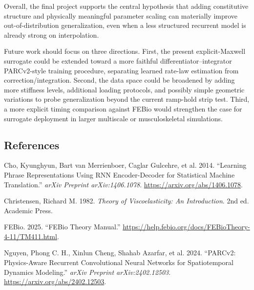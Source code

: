 \documentclass[
  10pt,
  letterpaper,
  DIV=11,
  numbers=noendperiod]{scrartcl}
\newlength{\cslhangindent}
\newenvironment{CSLReferences}[2] %
 {\begin{list}{}{%
  \setlength{\itemindent}{0pt}
  \setlength{\leftmargin}{0pt}
  \setlength{\parsep}{0pt}
  \ifodd #1
   \setlength{\leftmargin}{\cslhangindent}
   \setlength{\itemindent}{-1\cslhangindent}
  \fi
  \setlength{\itemsep}{#2\baselineskip}}}
 {\end{list}}
\begin{document}
Overall, the final project supports the central hypothesis that adding
constitutive structure and physically meaningful parameter scaling can
materially improve out-of-distribution generalization, even when a less
structured recurrent model is already strong on interpolation.

Future work should focus on three directions. First, the present
explicit-Maxwell surrogate could be extended toward a more faithful
differentiator--integrator PARCv2-style training procedure, separating
learned rate-law estimation from correction/integration. Second, the
data space could be broadened by adding more stiffness levels,
additional loading protocols, and possibly simple geometric variations
to probe generalization beyond the current ramp-hold strip test. Third,
a more explicit timing comparison against FEBio would strengthen the
case for surrogate deployment in larger multiscale or musculoskeletal
simulations.

\subsection*{References}\label{references}

\protect{}\label{refs}
\begin{CSLReferences}{1}{1}
Cho, Kyunghyun, Bart van Merrienboer, Caglar Gulcehre, et al. 2014.
{``Learning Phrase Representations Using {RNN} Encoder-Decoder for
Statistical Machine Translation.''} \emph{arXiv Preprint
arXiv:1406.1078}. \url{https://arxiv.org/abs/1406.1078}.

Christensen, Richard M. 1982. \emph{Theory of Viscoelasticity: An
Introduction}. 2nd ed. Academic Press.

FEBio. 2025. {``{FEBio Theory Manual}.''}
\url{https://help.febio.org/docs/FEBioTheory-4-11/TM411.html}.

Nguyen, Phong C. H., Xinlun Cheng, Shahab Azarfar, et al. 2024.
{``{PARCv2}: Physics-Aware Recurrent Convolutional Neural Networks for
Spatiotemporal Dynamics Modeling.''} \emph{arXiv Preprint
arXiv:2402.12503}. \url{https://arxiv.org/abs/2402.12503}.

\end{CSLReferences}
\end{document}
